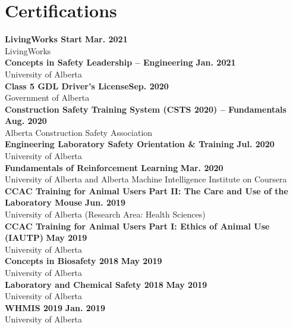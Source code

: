 \documentclass{article}
\begin{document}
\section*{\textcolor{my_colour}{Certifications}}
\vspace{-.25em} \hrulefill \vspace{.75em}

\textbf{LivingWorks Start} \hfill \textbf{Mar. 2021}\\
LivingWorks\\[0.5em]
\textbf{Concepts in Safety Leadership -- Engineering} \hfill \textbf{Jan. 2021}\\
University of Alberta\\[0.5em]
\textbf{Class 5 GDL Driver's License}\hfill \textbf{Sep. 2020}\\
Government of Alberta\\[0.5em]
\textbf{Construction Safety Training System (CSTS 2020) -- Fundamentals} \hfill \textbf{Aug. 2020}\\
Alberta Construction Safety Association\\[0.5em]
\textbf{Engineering Laboratory Safety Orientation \& Training} \hfill \textbf{Jul. 2020}\\
University of Alberta\\[0.5em]
\textbf{Fundamentals of Reinforcement Learning} \hfill \textbf{Mar. 2020}\\
University of Alberta and Alberta Machine Intelligence Institute on Coursera\\[0.5em]
\textbf{CCAC Training for Animal Users Part II: The Care and Use of the Laboratory Mouse} \hfill \textbf{Jun. 2019}\\
University of Alberta (Research Area: Health Sciences)\\[0.5em]
\textbf{CCAC Training for Animal Users Part I: Ethics of Animal Use (IAUTP)} \hfill \textbf{May 2019}\\
University of Alberta\\[0.5em]
\textbf{Concepts in Biosafety 2018} \hfill \textbf{May 2019}\\
University of Alberta\\[0.5em]
\textbf{Laboratory and Chemical Safety 2018} \hfill \textbf{May 2019}\\
University of Alberta\\[0.5em]
\textbf{WHMIS 2019} \hfill \textbf{Jan. 2019}\\
University of Alberta\\[0.5em]
\end{document}
